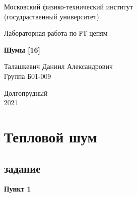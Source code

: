 \documentclass[a4paper, 14pt]{extarticle}%
\date{}
\begin{document}
\begin{titlepage}

	\newpage
	\begin{center}
		\normalsize Московский физико-технический институт \\(госудраственный 			университет)
	\end{center}

	\vspace{6em}

	\begin{center}
		\Large Лабораторная работа по РТ цепям\\
	\end{center}

	\vspace{1em}

	\begin{center}
		\large \textbf{Шумы [16]}
	\end{center}

	\vspace{2em}

	\begin{center}
		\large Талашкевич Даниил Александрович\\
		Группа Б01-009
	\end{center}

	\vspace{\fill}

	\begin{center}
	Долгопрудный \\2021
	\end{center}
	
\end{titlepage}



	\thispagestyle{empty}
	\newpage
	\tableofcontents
	\newpage
	\setcounter{page}{1}



\section{Тепловой шум}

\subsection{задание}

\textbf{Пункт 1}
\end{document}

